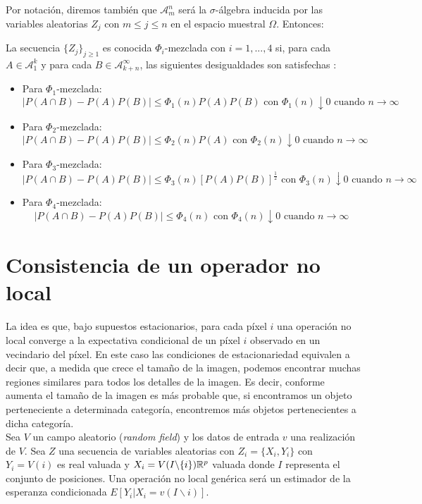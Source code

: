 \begin{itemize}
Por notación, diremos también que $\mathscr{A}_m^n$ será la $\sigma$-álgebra inducida por las variables aleatorias $Z_j$ con $m\le j \le n$ en el espacio muestral $\Omega$. Entonces:\\

\begin{definicion}\label{def:mezcla}
La secuencia $\{Z_j\}_{j\ge 1}$ es conocida $\Phi_i$-mezclada con $i=1,...,4$ si, para cada $A \in \mathscr{A}_1^k$ y para cada $B\in \mathscr{A}_{k+n}^{\infty}$, las siguientes desigualdades son satisfechas \cite{RePEc:eee:spapps:v:36:y:1990:i:1:p:107-116}:
\begin{itemize}
\item Para $\Phi_1$-mezclada: $$|P(A\cap B) - P(A)P(B)| \le \Phi_1 (n)P(A)P(B)\text{ con } \Phi_1(n)\downarrow 0 \text{ cuando } n\to \infty$$
\item Para $\Phi_2$-mezclada: $$|P(A\cap B) - P(A)P(B)| \le \Phi_2 (n)P(A)\text{ con } \Phi_2(n)\downarrow 0 \text{ cuando } n\to \infty$$
\item Para $\Phi_3$-mezclada: $$|P(A\cap B) - P(A)P(B)| \le \Phi_3 (n)[P(A)P(B)]^\frac{1}{2} \text{ con } \Phi_3(n)\downarrow 0 \text{ cuando } n\to \infty$$
\item Para $\Phi_4$-mezclada: $$|P(A\cap B) - P(A)P(B)| \le \Phi_4 (n) \text{ con } \Phi_4(n)\downarrow 0 \text{ cuando } n\to \infty$$
\end{itemize}
\end{definicion}

\section{Consistencia de un operador no local}
La idea es que, bajo supuestos estacionarios, para cada píxel $i$ una operación no local converge a la expectativa condicional de un píxel $i$ observado en un vecindario del píxel. En este caso las condiciones de estacionariedad equivalen a decir que, a medida que crece el tamaño de la imagen, podemos encontrar muchas regiones similares para todos los detalles de la imagen. Es decir, conforme aumenta el tamaño de la imagen es más probable que, si encontramos un objeto perteneciente a determinada categoría, encontremos más objetos pertenecientes a dicha categoría.\\

Sea $V$ un campo aleatorio (\emph{random field}) y los datos de entrada $v$ una realización de $V$. Sea $Z$ una secuencia de variables aleatorias con $Z_i=\{X_i,Y_i\}$ con $Y_i=V(i)$ es real valuada y $X_i=V(I\backslash \{i\}) \mathbb{R}^p$ valuada donde $I$ representa el conjunto de posiciones. Una operación no local genérica será un estimador de la esperanza condicionada $E[Y_i|X_i=v(I\backslash{i})]$. \cite{Buades:2005:NAI:1068508.1069066}


\end{itemize}
